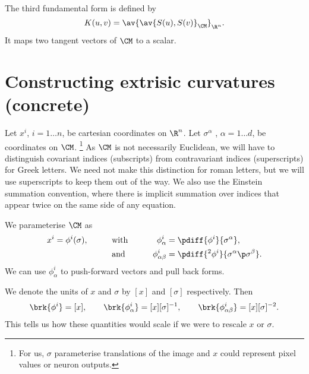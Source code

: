 \documentclass[12pt]{article}
\newcommand{\inv}{^{-1}}
\newcommand{\invsq}{^{-2}}
\begin{document}
The third fundamental form is defined by \cite{Eschenburg2010228}
%
\begin{equation}\label{eq:third fund}
  K(u,v) =  \av{ \av{S(u),S(v)}_\CM }_{\R^n}.
\end{equation}
%
It maps two tangent vectors of $\CM$ to a scalar.


\section{Constructing extrisic curvatures (concrete)}\label{sec:scalarcurv}

Let $x^i$, $i=1 \ldots n$, be cartesian coordinates on $\R^n$.
Let $\sigma^\alpha$ , $\alpha=1 \dots d$, be coordinates on $\CM$.%
\footnote{For us, $\sigma$ parameterise translations of the image and $x$ could represent pixel values or neuron outputs.}
As $\CM$ is not necessarily Euclidean, we will have to distinguish covariant indices (subscripts) from contravariant indices (superscripts) for Greek letters.
We need not make this distinction for roman letters, but we will use superscripts to keep them out of the way.
We also use the Einstein summation convention, where there is implicit summation over indices that appear twice on the same side of any equation.

We parameterise $\CM$ as
%
\begin{equation}\label{eq:embedding}
  \begin{aligned}
  x^i &= \phi^i(\sigma), &
    \qquad &\text{with} \qquad &
      \phi^i_\alpha &= \pdiff{\phi^i}{\sigma^\alpha}, \\ 
    &&&\text{and}&
      \phi^i_{\alpha\beta} &=  \pdiff{{}^2\phi^i}{\sigma^\alpha\p\sigma^\beta}.
  \end{aligned}
\end{equation}
%
We can use $\phi^i_\alpha$ to push-forward vectors and pull back forms.

We denote the units of $x$ and $\sigma$ by $[x]$ and $[\sigma]$ respectively.
Then
%
\begin{equation}\label{eq:phiunits}
  \brk{\phi^i} = [x],
  \qquad
  \brk{\phi^i_\alpha} = [x][\sigma]\inv,
  \qquad
  \brk{\phi^i_{\alpha\beta}} = [x][\sigma]\invsq.
\end{equation}
%
This tells us how these quantities would scale if we were to rescale $x$ or $\sigma$.
\end{document}
